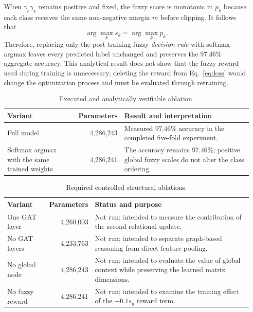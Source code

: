 \documentclass[10pt,conference]{IEEEtran}
\begin{document}
When $\gamma_c\gamma_s$ remains positive and fixed, the fuzzy score is monotonic in $p_k$ because each class receives the same non-negative margin $m$ before clipping. It follows that
\begin{equation}
\arg\max_k s_k=\arg\max_k p_k.
\end{equation}
Therefore, replacing only the post-training fuzzy \emph{decision rule} with softmax argmax leaves every predicted label unchanged and preserves the 97.46\% aggregate accuracy. This analytical result does not show that the fuzzy reward used during training is unnecessary; deleting the reward from Eq.~\eqref{eq:loss} would change the optimization process and must be evaluated through retraining.

\begin{table}[!t]
\caption{Executed and analytically verifiable ablation.}
\label{tab:ablation}
\centering
\scriptsize
\setlength{\tabcolsep}{2.4pt}
\begin{tabular}{p{2.35cm}rp{3.0cm}}
\toprule
Variant & Parameters & Result and interpretation\\
\midrule
Full model
& 4,286,243
& Measured 97.46\% accuracy in the completed five-fold experiment.\\
Softmax argmax with the same trained weights
& 4,286,241
& The accuracy remains 97.46\%; positive global fuzzy scales do not alter the class ordering.\\
\bottomrule
\end{tabular}
\end{table}

\begin{table}[!t]
\caption{Required controlled structural ablations.}
\label{tab:plannedablation}
\centering
\scriptsize
\setlength{\tabcolsep}{2.4pt}
\begin{tabular}{p{2.2cm}rp{3.15cm}}
\toprule
Variant & Parameters & Status and purpose\\
\midrule
One GAT layer
& 4,260,003
& Not run; intended to measure the contribution of the second relational update.\\
No GAT layers
& 4,233,763
& Not run; intended to separate graph-based reasoning from direct feature pooling.\\
No global node
& 4,286,243
& Not run; intended to evaluate the value of global context while preserving the learned matrix dimensions.\\
No fuzzy reward
& 4,286,241
& Not run; intended to examine the training effect of the $-0.1s_y$ reward term.\\
\bottomrule
\end{tabular}
\end{table}
\end{document}
